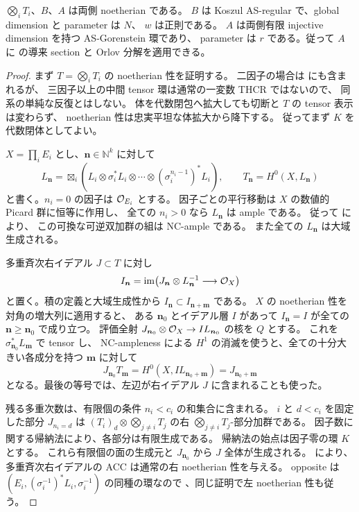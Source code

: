 \begin{lemma}
\label{mbnp:lem:noetherian}
$\bigotimes_iT_i$、$B$、$A$ は両側 noetherian である。
$B$ は Koszul AS-regular で、global dimension と parameter は $N$、
$w$ は正則である。
$A$ は両側有限 injective dimension を持つ AS-Gorenstein 環であり、
parameter は $r$ である。従って $A$ に
\cite[Proposition~4.18, Lemmas~6.1--6.2, Theorem~6.4]{LP-BS}
の導来 section と Orlov 分解を適用できる。
\end{lemma}
\begin{proof}
まず $T=\bigotimes_iT_i$ の noetherian 性を証明する。
二因子の場合は \cite[Corollary~3.5]{MBNPKeelerMultiple}にも含まれるが、
三因子以上の中間 tensor 環は通常の一変数 THCR ではないので、
同系の単純な反復とはしない。
体を代数閉包へ拡大しても切断と $T$ の tensor 表示は変わらず、
noetherian 性は忠実平坦な体拡大から降下する。
従ってまず $K$ を代数閉体としてよい。

$X=\prod_iE_i$ とし、$\boldsymbol n\in\mathbb N^k$ に対して
\[
 L_{\boldsymbol n}=\boxtimes_i
    (L_i\otimes\sigma_i^*L_i\otimes\cdots
                  \otimes(\sigma_i^{n_i-1})^*L_i),\qquad
 T_{\boldsymbol n}=H^0(X,L_{\boldsymbol n})
\]
と書く。$n_i=0$ の因子は $\mathcal O_{E_i}$ とする。
因子ごとの平行移動は $X$ の数値的 Picard 群に恒等に作用し、
全ての $n_i>0$ なら $L_{\boldsymbol n}$ は ample である。
従って \cite[Theorem~2.7]{MBNPKeelerMultiple}により、
この可換な可逆双加群の組は NC-ample である。
また全ての $L_{\boldsymbol n}$ は大域生成される。

多重斉次右イデアル $J\subset T$ に対し
\[
 I_{\boldsymbol n}
  =\operatorname{im}\bigl(J_{\boldsymbol n}\otimes
                    L_{\boldsymbol n}^{-1}\longrightarrow\mathcal O_X\bigr)
\]
と置く。積の定義と大域生成性から
$I_{\boldsymbol n}\subset I_{\boldsymbol n+\boldsymbol m}$ である。
$X$ の noetherian 性を対角の増大列に適用すると、
ある $\boldsymbol n_0$ とイデアル層 $I$ があって
$I_{\boldsymbol n}=I$ が全ての $\boldsymbol n\geq\boldsymbol n_0$ で成り立つ。
評価全射
$J_{\boldsymbol n_0}\otimes\mathcal O_X\to I L_{\boldsymbol n_0}$
の核を $Q$ とする。
これを $\sigma_{\boldsymbol n_0}^*L_{\boldsymbol m}$ で tensor し、
NC-ampleness による $H^1$ の消滅を使うと、全ての十分大きい各成分を持つ
$\boldsymbol m$ に対して
\[
 J_{\boldsymbol n_0}T_{\boldsymbol m}
    =H^0(X,I L_{\boldsymbol n_0+\boldsymbol m})
    =J_{\boldsymbol n_0+\boldsymbol m}
\]
となる。最後の等号では、左辺が右イデアル $J$ に含まれることも使った。

残る多重次数は、有限個の条件 $n_i<c_i$ の和集合に含まれる。
$i$ と $d<c_i$ を固定した部分 $J_{n_i=d}$ は
$(T_i)_d\otimes\bigotimes_{j\ne i}T_j$ の右
$\bigotimes_{j\ne i}T_j$-部分加群である。
因子数に関する帰納法により、各部分は有限生成である。
帰納法の始点は因子零の環 $K$ とする。
これら有限個の面の生成元と $J_{\boldsymbol n_0}$ から $J$ 全体が生成される。
\cite[Lemma~4.4(1)]{MBNPKeelerMultiple}により、
多重斉次右イデアルの ACC は通常の右 noetherian 性を与える。
opposite は $(E_i,(\sigma_i^{-1})^*L_i,\sigma_i^{-1})$ の同種の環なので
\cite[Lemma~2.4]{MBNPKeelerMultiple}、同じ証明で左 noetherian 性も従う。


\end{proof}
